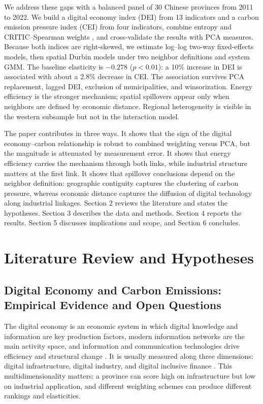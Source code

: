 \documentclass[economies,article,submit,moreauthors]{Definitions/mdpi}
\begin{document}
We address these gaps with a balanced panel of 30 Chinese provinces from 2011 to 2022. We build a digital economy index (DEI) from 13 indicators and a carbon emission pressure index (CEI) from four indicators, combine entropy and CRITIC--Spearman weights \citep{shannon1948,diakoulaki1995}, and cross-validate the results with PCA measures. Because both indices are right-skewed, we estimate log--log two-way fixed-effects models, then spatial Durbin models under two neighbor definitions and system GMM. The baseline elasticity is $-0.278$ ($p<0.01$): a 10\% increase in DEI is associated with about a 2.8\% decrease in CEI. The association survives PCA replacement, lagged DEI, exclusion of municipalities, and winsorization. Energy efficiency is the stronger mechanism; spatial spillovers appear only when neighbors are defined by economic distance. Regional heterogeneity is visible in the western subsample but not in the interaction model.

The paper contributes in three ways. It shows that the sign of the digital economy--carbon relationship is robust to combined weighting versus PCA, but the magnitude is attenuated by measurement error. It shows that energy efficiency carries the mechanism through both links, while industrial structure matters at the first link. It shows that spillover conclusions depend on the neighbor definition: geographic contiguity captures the clustering of carbon pressure, whereas economic distance captures the diffusion of digital technology along industrial linkages. Section 2 reviews the literature and states the hypotheses. Section 3 describes the data and methods. Section 4 reports the results. Section 5 discusses implications and scope, and Section 6 concludes.

\section{Literature Review and Hypotheses}

\subsection{Digital Economy and Carbon Emissions: Empirical Evidence and Open Questions}

The digital economy is an economic system in which digital knowledge and information are key production factors, modern information networks are the main activity space, and information and communication technologies drive efficiency and structural change \citep{tapscott,g20}. It is usually measured along three dimensions: digital infrastructure, digital industry, and digital inclusive finance \citep{guo2020report}. This multidimensionality matters: a province can score high on infrastructure but low on industrial application, and different weighting schemes can produce different rankings and elasticities.
\end{document}
